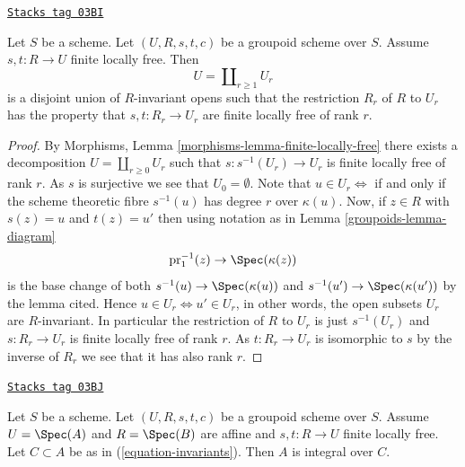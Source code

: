 \begin{lemma}
\label{groupoids-lemma-finite-locally-free-disjoint-free}
\href{https://stacks.math.columbia.edu/tag/03BI}{\texttt{Stacks tag 03BI}}

Let $S$ be a scheme. Let $(U, R, s, t, c)$ be a groupoid scheme over $S$.
Assume $s, t : R \to U$ finite locally free.
Then
$$
U = \coprod\nolimits_{r \geq 1} U_r
$$
is a disjoint union of $R$-invariant opens such that the restriction $R_r$ of
$R$ to $U_r$ has the property that $s, t : R_r \to U_r$ are finite locally
free of rank $r$.
\end{lemma}

\begin{proof}

By
Morphisms, Lemma \ref{morphisms-lemma-finite-locally-free}
there exists a decomposition
$U = \coprod\nolimits_{r \geq 0} U_r$
such that $s : s^{-1}(U_r) \to U_r$ is finite locally free of rank $r$.
As $s$ is surjective we see that $U_0 = \emptyset$.
Note that $u \in U_r \Leftrightarrow$ if and only if the scheme theoretic fibre
$s^{-1}(u)$ has degree $r$ over $\kappa(u)$. Now, if $z \in R$ with $s(z) = u$
and $t(z) = u'$ then using notation as in Lemma \ref{groupoids-lemma-diagram}
$$
\text{pr}_1^{-1}(z) \to \Spec(\kappa(z))
$$
is the base change of both
$s^{-1}(u) \to \Spec(\kappa(u))$ and $s^{-1}(u') \to \Spec(\kappa(u'))$
by the lemma cited. Hence $u \in U_r \Leftrightarrow u' \in U_r$,
in other words, the open subsets $U_r$ are $R$-invariant.
In particular the restriction of $R$ to $U_r$ is just
$s^{-1}(U_r)$ and $s : R_r \to U_r$ is finite locally free of rank $r$.
As $t : R_r \to U_r$ is isomorphic to $s$ by the inverse of $R_r$
we see that it has also rank $r$.
\end{proof}

\begin{lemma}
\label{groupoids-lemma-integral-over-invariants}
\href{https://stacks.math.columbia.edu/tag/03BJ}{\texttt{Stacks tag 03BJ}}

Let $S$ be a scheme. Let $(U, R, s, t, c)$ be a groupoid scheme over $S$.
Assume $U = \Spec(A)$ and $R = \Spec(B)$ are affine and
$s, t : R \to U$ finite locally free.
Let $C \subset A$ be as in (\ref{equation-invariants}).
Then $A$ is integral over $C$.
\end{lemma}

